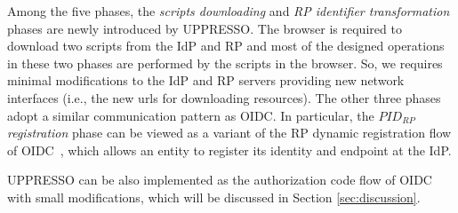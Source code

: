 Among the five phases, the {\em scripts downloading} and {\em RP identifier transformation} phases are newly introduced by UPPRESSO. The browser is required to download two scripts from the IdP and RP and most of the designed operations in these two phases are performed by the scripts in the browser. So, we requires minimal modifications to the IdP and RP servers providing new network interfaces (i.e., the new urls for downloading resources). The other three phases adopt a similar communication pattern as OIDC. In particular, the {\em $PID_{RP}$ registration} phase can be viewed as a variant of the RP dynamic registration flow of OIDC~\cite{DynamicRegistration}, which allows an entity to register its identity and endpoint at the IdP.

UPPRESSO can be also implemented as the authorization code flow of OIDC with small modifications, which will be discussed in Section \ref{sec:discussion}.



